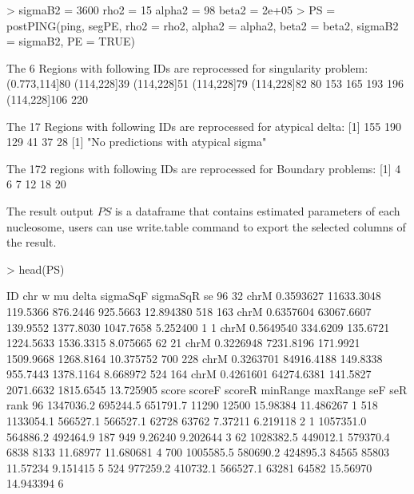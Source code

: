 \documentclass[11pt]{article}
\begin{document}
\begin{Schunk}
\begin{Sinput}
> {
     sigmaB2 = 3600
     rho2 = 15
     alpha2 = 98
     beta2 = 2e+05
 }
> PS = postPING(ping, segPE, rho2 = rho2, alpha2 = alpha2, beta2 = beta2, 
     sigmaB2 = sigmaB2, PE = TRUE)
\end{Sinput}
\begin{Soutput}
 The 6 Regions with following IDs are reprocessed for singularity problem: 
(0.773,114]80   (114,228]39   (114,228]51   (114,228]79   (114,228]82 
           80           153           165           193           196 
 (114,228]106 
          220 

 The 17 Regions with following IDs are reprocessed for atypical delta: 
[1] 155 190 129  41  37  28
[1] "No predictions with atypical sigma"

 The 172 regions with following IDs are reprocessed for Boundary problems: 
[1]  4  6  7 12 18 20
\end{Soutput}
\end{Schunk}
The result output $PS$ is a dataframe that contains estimated parameters of each nucleosome, users can use write.table command to export the selected columns of the result.
\begin{Schunk}
\begin{Sinput}
> head(PS)
\end{Sinput}
\begin{Soutput}
     ID  chr         w         mu    delta  sigmaSqF  sigmaSqR        se
96   32 chrM 0.3593627 11633.3048 119.5366  876.2446  925.5663 12.894380
518 163 chrM 0.6357604 63067.6607 139.9552 1377.8030 1047.7658  5.252400
1     1 chrM 0.5649540   334.6209 135.6721 1224.5633 1536.3315  8.075665
62   21 chrM 0.3226948  7231.8196 171.9921 1509.9668 1268.8164 10.375752
700 228 chrM 0.3263701 84916.4188 149.8338  955.7443 1378.1164  8.668972
524 164 chrM 0.4261601 64274.6381 141.5827 2071.6632 1815.6545 13.725905
        score   scoreF   scoreR minRange maxRange      seF       seR rank
96  1347036.2 695244.5 651791.7    11290    12500 15.98384 11.486267    1
518 1133054.1 566527.1 566527.1    62728    63762  7.37211  6.219118    2
1   1057351.0 564886.2 492464.9      187      949  9.26240  9.202644    3
62  1028382.5 449012.1 579370.4     6838     8133 11.68977 11.680681    4
700 1005585.5 580690.2 424895.3    84565    85803 11.57234  9.151415    5
524  977259.2 410732.1 566527.1    63281    64582 15.56970 14.943394    6
\end{Soutput}
\end{Schunk}
\end{document}
